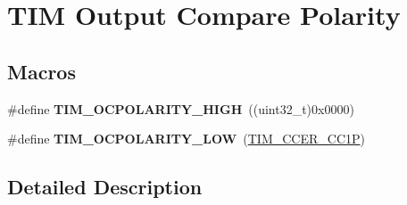 \hypertarget{group___t_i_m___output___compare___polarity}{\section{T\-I\-M Output Compare Polarity}
\label{group___t_i_m___output___compare___polarity}
}
\subsection*{Macros}
\begin{DoxyCompactItemize}
\item 
\hypertarget{group___t_i_m___output___compare___polarity_ga5887380660b742f0045e9695914231b8}{\#define {\bfseries T\-I\-M\-\_\-\-O\-C\-P\-O\-L\-A\-R\-I\-T\-Y\-\_\-\-H\-I\-G\-H}~((uint32\-\_\-t)0x0000)}\label{group___t_i_m___output___compare___polarity_ga5887380660b742f0045e9695914231b8}

\item 
\hypertarget{group___t_i_m___output___compare___polarity_ga1daff1574b0a2d17ccc9ae40a649ac37}{\#define {\bfseries T\-I\-M\-\_\-\-O\-C\-P\-O\-L\-A\-R\-I\-T\-Y\-\_\-\-L\-O\-W}~(\hyperlink{group___peripheral___registers___bits___definition_ga0ca0aedba14241caff739afb3c3ee291}{T\-I\-M\-\_\-\-C\-C\-E\-R\-\_\-\-C\-C1\-P})}\label{group___t_i_m___output___compare___polarity_ga1daff1574b0a2d17ccc9ae40a649ac37}

\end{DoxyCompactItemize}


\subsection{Detailed Description}
